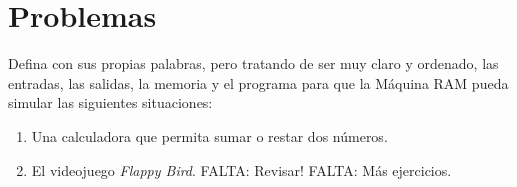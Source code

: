 \section{Problemas}
\begin{Exercise}[title={Acercamiento inicial}]	
	
Defina con sus propias palabras, pero tratando de ser muy claro y ordenado, las entradas, las salidas, la memoria y el programa para que la Máquina RAM pueda simular las siguientes situaciones:

	\begin{enumerate}
		\item Una calculadora que permita sumar o restar dos números.
		
		\item El videojuego \emph{Flappy Bird}. FALTA: Revisar! FALTA: Más ejercicios.
	\end{enumerate}
\end{Exercise}
